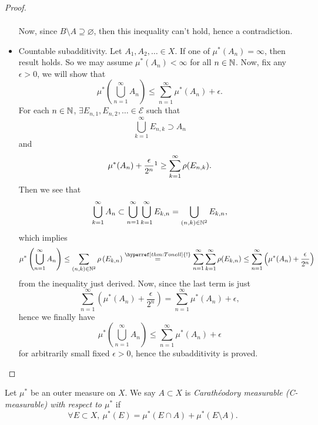 \begin{proof}
\begin{itemize}
\[\begin{split}
			      \end{split}
		      \]
		      Now, since \(B\setminus A\supseteq \varnothing \), then this inequality can't hold, hence a contradiction\conta.
		\item Countable subadditivity. Let \(A_1, A_2, \ldots \in X \). If one of \(\mu^{*} (A_{n}) = \infty \), then result holds.
		      So we may assume \(\mu^{*} (A_n)<\infty \) for all \(n\in \mathbb{\MakeUppercase{N}} \). Now, fix any \(\epsilon >0\),
		      we will show that
		      \[
			      \mu^{*} \left(\bigcup\limits_{n=1}^{\infty} A_n\right)\leq \sum\limits_{n=1}^{\infty} \mu^{*} (A_n)+\epsilon.
		      \]
		      For each \(n\in\mathbb{\MakeUppercase{N}} \), \(\exists E_{n, 1}, E_{n, 2}, \ldots \in \mathcal{E}\) such that
		      \[
			      \bigcup\limits_{k=1}^{\infty} E_{n, k}\supset A_n
		      \]
		      and
		      \[
			      \mu^{*} (A_n)+\frac{\epsilon}{2^n}\footnotemark \geq \sum\limits_{k=1}^{\infty} \rho(E_{n, k}).
		      \]
		      Then we see that
		      \[
			      \bigcup\limits_{k=1}^{\infty} A_n \subset \bigcup\limits_{n=1}^{\infty} \bigcup\limits_{k=1}^{\infty} E_{k, n} = \bigcup\limits_{(n, k)\in\mathbb{\MakeUppercase{N}} ^2} E_{k, n},
		      \]
		      which implies
		      \[
			      \mu^{*} \left(\bigcup\limits_{n=1}^{\infty} A_{n}\right)
			      \leq \sum\limits_{(n, k)\in\mathbb{\MakeUppercase{N}} ^2} \rho\left(E_{k, n}\right)
			      \overset{\hyperref[thm:Tonell]{\text{!}}}{=} \sum\limits_{n=1}^{\infty} \sum\limits_{k=1}^{\infty} \rho(E_{k, n})
			      \leq \sum\limits_{n=1}^{\infty} \left(\mu^{*} (A_n) + \frac{\epsilon}{2^n}\right)
		      \]
		      from the inequality just derived. Now, since the last term is just
		      \[
			      \sum\limits_{n=1}^{\infty} \left(\mu^{*} (A_n) + \frac{\epsilon}{2^n}\right) = \sum\limits_{n=1}^{\infty} \mu^{*} (A_n)+\epsilon,
		      \]
		      hence we finally have
		      \[
			      \mu^{*} \left(\bigcup\limits_{n=1}^{\infty} A_{n}\right)\leq \sum\limits_{n=1}^{\infty} \mu^{*} (A_n)+\epsilon
		      \]
		      for arbitrarily small fixed \(\epsilon >0\), hence the subadditivity is proved.
	\end{itemize}
\end{proof}

\begin{definition}
	Let \(\mu^{*} \) be an outer measure on \(X\). We say \(A\subset X\) is \emph{Carathéodory measurable (C-measurable) with respect to \(\mu^{*} \)} if
	\[
		\forall E\subset X,\ \mu^{*} (E) = \mu^{*} \left(E\cap A\right) + \mu^{*} \left(E\setminus A\right).
	\]
\end{definition}

